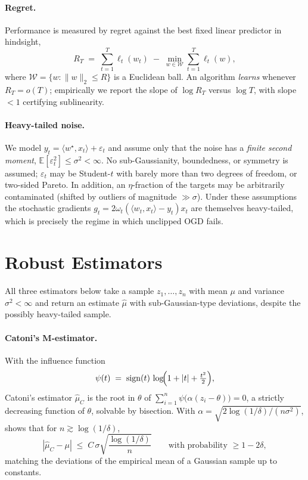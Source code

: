 \documentclass[11pt]{article}
\newcommand{\E}{\mathbb{E}}
\newcommand{\ip}[2]{\langle #1, #2 \rangle}
\newcommand{\norm}[1]{\lVert #1 \rVert}
\begin{document}
\paragraph{Regret.} Performance is measured by regret against the best fixed linear
predictor in hindsight,
\begin{equation}
R_T \;=\; \sum_{t=1}^{T} \ell_t(w_t) \;-\; \min_{w \in \mathcal{W}} \sum_{t=1}^{T} \ell_t(w),
\end{equation}
where $\mathcal{W} = \{ w : \norm{w}_2 \le R \}$ is a Euclidean ball. An algorithm
\emph{learns} whenever $R_T = o(T)$; empirically we report the slope of
$\log R_T$ versus $\log T$, with slope $< 1$ certifying sublinearity.

\paragraph{Heavy-tailed noise.} We model $y_t = \ip{w^\star}{x_t} + \varepsilon_t$ and
assume only that the noise has a \emph{finite second moment},
$\E[\varepsilon_t^2] \le \sigma^2 < \infty$. No sub-Gaussianity, boundedness, or symmetry
is assumed; $\varepsilon_t$ may be Student-$t$ with barely more than two degrees of
freedom, or two-sided Pareto. In addition, an $\eta$-fraction of the targets may be
arbitrarily contaminated (shifted by outliers of magnitude $\gg \sigma$). Under these
assumptions the stochastic gradients $g_t = 2 \omega_t (\ip{w_t}{x_t} - y_t) x_t$ are
themselves heavy-tailed, which is precisely the regime in which unclipped OGD fails.

\section{Robust Estimators}

All three estimators below take a sample $z_1, \dots, z_n$ with mean $\mu$ and variance
$\sigma^2 < \infty$ and return an estimate $\hat{\mu}$ with sub-Gaussian-type deviations,
despite the possibly heavy-tailed sample.

\paragraph{Catoni's M-estimator.} With the influence function
\begin{equation}
\psi(t) \;=\; \operatorname{sign}(t) \, \log\!\Bigl( 1 + |t| + \tfrac{t^2}{2} \Bigr),
\end{equation}
Catoni's estimator $\hat{\mu}_C$ is the root in $\theta$ of
$\sum_{i=1}^{n} \psi\bigl( \alpha (z_i - \theta) \bigr) = 0$, a strictly decreasing
function of $\theta$, solvable by bisection. With
$\alpha = \sqrt{2 \log(1/\delta) / (n \sigma^2)}$,
\citet{catoni2012challenging} shows that for $n \gtrsim \log(1/\delta)$,
\begin{equation}
|\hat{\mu}_C - \mu| \;\le\; C \, \sigma \sqrt{\frac{\log(1/\delta)}{n}}
\qquad \text{with probability } \ge 1 - 2\delta,
\end{equation}
matching the deviations of the empirical mean of a Gaussian sample up to constants.
\end{document}
